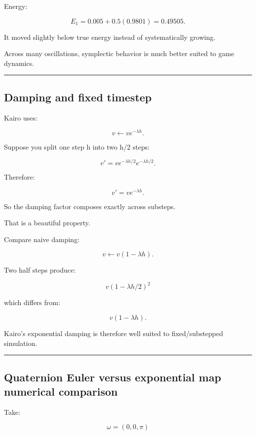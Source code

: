 Energy:

\[
E_1
=
0.005+
0.5(0.9801)
=
0.49505.
\]

It moved slightly below true energy instead of systematically growing.

Across many oscillations, symplectic behavior is much better suited to game dynamics.

\begin{center}\rule{0.5\linewidth}{0.5pt}\end{center}

\subsection{Damping and fixed timestep}\label{06-engine-ii-ch038-damping-and-fixed-timestep}

Kairo uses:

\[
v\leftarrow ve^{-\lambda h}.
\]

Suppose you split one step h into two h/2 steps:

\[
v'
=
v e^{-\lambda h/2}
e^{-\lambda h/2}.
\]

Therefore:

\[
v'
=
v e^{-\lambda h}.
\]

So the damping factor composes exactly across substeps.

That is a beautiful property.

Compare naive damping:

\[
v\leftarrow v(1-\lambda h).
\]

Two half steps produce:

\[
v(1-\lambda h/2)^2
\]

which differs from:

\[
v(1-\lambda h).
\]

Kairo's exponential damping is therefore well suited to fixed/substepped simulation.

\begin{center}\rule{0.5\linewidth}{0.5pt}\end{center}

\subsection{Quaternion Euler versus exponential map numerical comparison}\label{06-engine-ii-ch038-quaternion-euler-versus-exponential-map-numerical-comparison}

Take:

\[
\omega=(0,0,\pi)
\]

